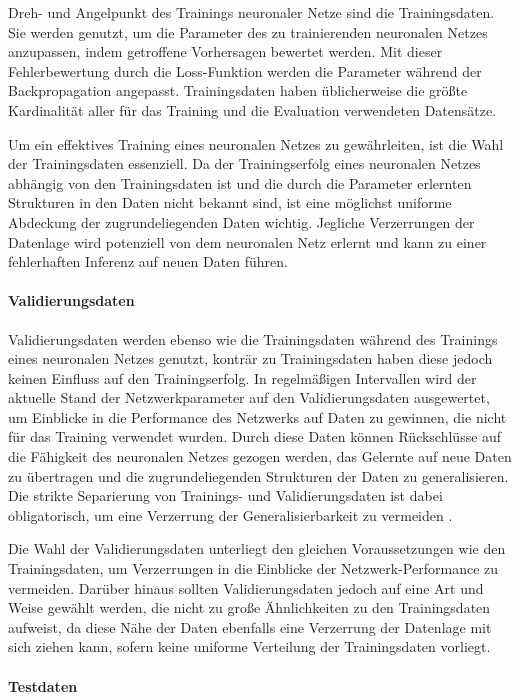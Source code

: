 Dreh- und Angelpunkt des Trainings neuronaler Netze sind die Trainingsdaten. Sie werden genutzt, um die Parameter des zu trainierenden neuronalen Netzes anzupassen, indem getroffene Vorhersagen bewertet werden. Mit dieser Fehlerbewertung durch die Loss-Funktion werden die Parameter während der Backpropagation angepasst. Trainingsdaten haben üblicherweise die größte Kardinalität aller für das Training und die Evaluation verwendeten Datensätze.

Um ein effektives Training eines neuronalen Netzes zu gewährleiten, ist die Wahl der Trainingsdaten essenziell. Da der Trainingserfolg eines neuronalen Netzes abhängig von den Trainingsdaten ist und die durch die Parameter erlernten Strukturen in den Daten nicht bekannt sind, ist eine möglichst uniforme Abdeckung der zugrundeliegenden Daten wichtig. Jegliche Verzerrungen der Datenlage wird potenziell von dem neuronalen Netz erlernt und kann zu einer fehlerhaften Inferenz auf neuen Daten führen.

\paragraph{Validierungsdaten}

Validierungsdaten werden ebenso wie die Trainingsdaten während des Trainings eines neuronalen Netzes genutzt, konträr zu Trainingsdaten haben diese jedoch keinen Einfluss auf den Trainingserfolg. In regelmäßigen Intervallen wird der aktuelle Stand der Netzwerkparameter auf den Validierungsdaten ausgewertet, um Einblicke in die Performance des Netzwerks auf Daten zu gewinnen, die nicht für das Training verwendet wurden. Durch diese Daten können Rückschlüsse auf die Fähigkeit des neuronalen Netzes gezogen werden, das Gelernte auf neue Daten zu übertragen und die zugrundeliegenden Strukturen der Daten zu generalisieren. Die strikte Separierung von Trainings- und Validierungsdaten ist dabei obligatorisch, um eine Verzerrung der Generalisierbarkeit zu vermeiden \cite{nn_terminology}.

Die Wahl der Validierungsdaten unterliegt den gleichen Voraussetzungen wie den Trainingsdaten, um Verzerrungen in die Einblicke der Netzwerk-Performance zu vermeiden. Darüber hinaus sollten Validierungsdaten jedoch auf eine Art und Weise gewählt werden, die nicht zu große Ähnlichkeiten zu den Trainingsdaten aufweist, da diese Nähe der Daten ebenfalls eine Verzerrung der Datenlage mit sich ziehen kann, sofern keine uniforme Verteilung der Trainingsdaten vorliegt.

\paragraph{Testdaten}


